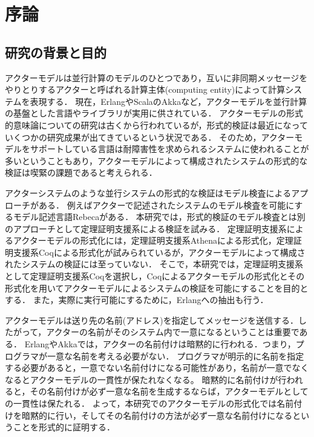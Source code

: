 \chapter{序論}
\label{chapter:intro}

\section{研究の背景と目的}
アクターモデル\cite{Agha:1986aa}は並行計算のモデルのひとつであり，互いに非同期メッセージをやりとりするアクターと呼ばれる計算主体(computing entity)によって計算システムを表現する．
現在，Erlang\cite{Erlang}やScala\cite{Scala}のAkka\cite{Akka}など，アクターモデルを並行計算の基盤とした言語やライブラリが実用に供されている．
アクターモデルの形式的意味論についての研究は古くから行われているが，形式的検証は最近になっていくつかの研究成果が出てきているという状況である．
そのため，アクターモデルをサポートしている言語は耐障害性を求められるシステムに使われることが多いということもあり，アクターモデルによって構成されたシステムの形式的な検証は喫緊の課題であると考えられる．

アクターシステムのような並行システムの形式的な検証はモデル検査によるアプローチがある．
例えばアクターで記述されたシステムのモデル検査を可能にするモデル記述言語Rebeca\cite{Sirjani:2011aa}がある．
本研究では，形式的検証のモデル検査とは別のアプローチとして定理証明支援系による検証を試みる．
定理証明支援系によるアクターモデルの形式化には，定理証明支援系Athenaによる形式化\cite{Musser:2013aa}，定理証明支援系Coqによる形式化\cite{Garnock-Jones:2014aa}が試みられているが，アクターモデルによって構成されたシステムの検証には至っていない．
そこで，本研究では，定理証明支援系として定理証明支援系Coqを選択し，Coqによるアクターモデルの形式化とその形式化を用いてアクターモデルによるシステムの検証を可能にすることを目的とする．
また，実際に実行可能にするために，Erlangへの抽出も行う．

アクターモデルは送り先の名前(アドレス)を指定してメッセージを送信する．したがって，アクターの名前がそのシステム内で一意になるということは重要である．
ErlangやAkkaでは，アクターの名前付けは暗黙的に行われる．つまり，プログラマが一意な名前を考える必要がない．
プログラマが明示的に名前を指定する必要があると，一意でない名前付けになる可能性があり，名前が一意でなくなるとアクターモデルの一貫性が保たれなくなる。
暗黙的に名前付けが行われると，その名前付けが必ず一意な名前を生成するならば，アクターモデルとしての一貫性は保たれる．
よって，本研究でのアクターモデルの形式化では名前付けを暗黙的に行い，そしてその名前付けの方法が必ず一意な名前付けになるということを形式的に証明する．

